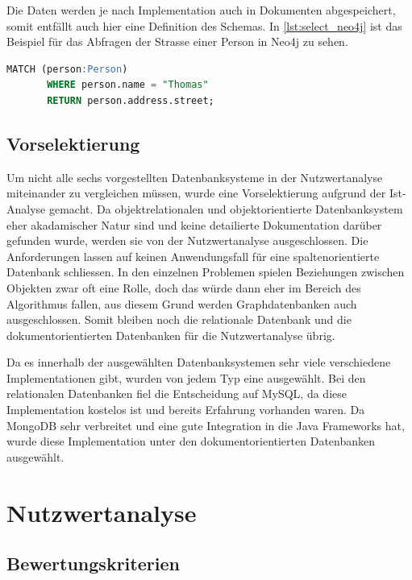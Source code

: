 Die Daten werden je nach Implementation auch in Dokumenten abgespeichert, somit entfällt auch hier eine Definition des Schemas. In \autoref{lst:select_neo4j} ist das Beispiel 
für das Abfragen der Strasse einer Person in Neo4j zu sehen.

\begin{lstlisting}[language=SQL, caption=Abfrage in Neo4j, label=lst:select_neo4j]  
       MATCH (person:Person)
       WHERE person.name = "Thomas"
       RETURN person.address.street;
\end{lstlisting}

\subsection{Vorselektierung}\label{preselection}
Um nicht alle sechs vorgestellten Datenbanksysteme in der Nutzwertanalyse miteinander zu vergleichen müssen, wurde eine Vorselektierung aufgrund der Ist-Analyse gemacht. Da 
objektrelationalen und objektorientierte Datenbanksystem eher akadamischer Natur sind und keine detailierte Dokumentation darüber gefunden wurde, werden sie von der Nutzwertanalyse 
ausgeschlossen. Die Anforderungen lassen auf keinen Anwendungsfall für eine spaltenorientierte Datenbank schliessen. In den einzelnen Problemen spielen Beziehungen zwischen Objekten 
zwar oft eine Rolle, doch das würde dann eher im Bereich des Algorithmus fallen, aus diesem Grund werden Graphdatenbanken auch ausgeschlossen. Somit bleiben noch die relationale 
Datenbank und die dokumentorientierten Datenbanken für die Nutzwertanalyse übrig.

Da es innerhalb der ausgewählten Datenbanksystemen sehr viele verschiedene Implementationen gibt, wurden von jedem Typ eine ausgewählt. Bei den relationalen Datenbanken fiel die 
Entscheidung auf MySQL, da diese Implementation kostelos ist und bereits Erfahrung vorhanden waren. Da MongoDB sehr verbreitet und eine gute Integration in die Java Frameworks hat, 
wurde diese Implementation unter den dokumentorientierten Datenbanken ausgewählt.

\newpage
\section{Nutzwertanalyse}\label{architektur_nutzwertanalyse}

\subsection{Bewertungskriterien}\label{architektur_bewertungspunkte}

